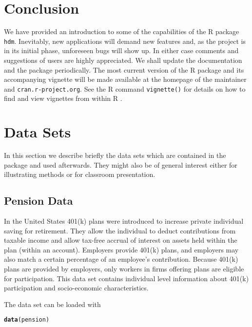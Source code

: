 \documentclass{amsart}\usepackage[]{graphicx}\usepackage[]{color}
\makeatletter
\newcommand{\hlstd}[1]{\textcolor[rgb]{0.345,0.345,0.345}{#1}}%
\newcommand{\hlkwd}[1]{\textcolor[rgb]{0.737,0.353,0.396}{\textbf{#1}}}%
\newenvironment{kframe}{%
 \def\at@end@of@kframe{}%
 \ifinner\ifhmode%
  \def\at@end@of@kframe{\end{minipage}}%
  \begin{minipage}{\columnwidth}%
 \fi\fi%
 \def\FrameCommand##1{\hskip\@totalleftmargin \hskip-\fboxsep
 \colorbox{shadecolor}{##1}\hskip-\fboxsep
     \hskip-\linewidth \hskip-\@totalleftmargin \hskip\columnwidth}%
 \MakeFramed {\advance\hsize-\width
   \@totalleftmargin\z@ \linewidth\hsize
   \@setminipage}}%
 {\par\unskip\endMakeFramed%
 \at@end@of@kframe}
\newenvironment{knitrout}{}{} %
\newcommand{\R}{{\normalfont\textsf{R }}{}}
\makeatother
\begin{document}
\section{Conclusion}

We have provided an introduction to some of the capabilities of the \R package \texttt{hdm}. Inevitably, new applications will demand new features and, as the project is in its initial phase, unforeseen bugs will show up. In either case comments and suggestions of users are highly appreciated. We shall update the documentation  and the package periodically. The most current version of the \R package and its accompanying vignette will be made available at the homepage of the maintainer and \texttt{cran.r-project.org}. See the \R command \texttt{vignette()} for details on how to find
and view vignettes from within \R.

\newpage
\appendix
\section{Data Sets}
In this section we describe briefly the data sets which are contained in the package and used afterwards. They might also be of general interest either for illustrating methods or for classroom presentation.
\subsection{Pension Data}
In the United States 401(k) plans were introduced to increase
private individual  saving  for  retirement. They allow the individual to deduct  contributions  from  taxable  income  and  allow  tax-free accrual of interest on assets held within the plan (within an account).  Employers  provide  401(k)  plans,  and  employers  may  also match a certain percentage of an employee's contribution.
Because  401(k)  plans  are  provided  by  employers,  only
workers in firms offering plans are eligible for participation. This data set contains individual level information about 401(k) participation and socio-economic characteristics.

The data set can be loaded with

\begin{knitrout}
\color{fgcolor}\begin{kframe}
\begin{alltt}
\hlkwd{data}\hlstd{(pension)}
\end{alltt}
\end{kframe}
\end{knitrout}
\end{document}
